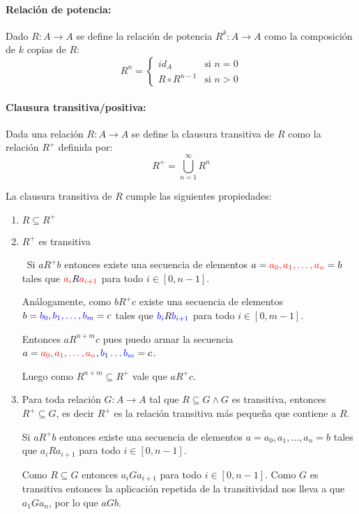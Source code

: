 \paragraph{Relación de potencia:} Dado \(R: A\to A\) se define la relación de potencia \(R^k: A\to A\) como la composición de \(k\) copias de \(R\):
\[R^n = \left\{
  \begin{array}{ll}
    id_A           & \text{si } n = 0 \\
    R\circ R^{n-1} & \text{si } n > 0
  \end{array}
  \right.
\]

\paragraph{Clausura transitiva/positiva:} Dada una relación \(R:A\to A\) se define la clausura transitiva de \(R\) como la relación \(R^+\) definida por: \[R^+ = \bigcup_{n=1}^\infty R^n\]

La clausura transitiva de \(R\) cumple las siguientes propiedades:
\begin{enumerate}
  \item \(R\subseteq R^+\)
        \newpage
  \item \(R^+\) es transitiva
        \begin{demo}[0.86\textwidth]
          ~Si \(a R^+ b\) entonces existe una secuencia de elementos \(a = {\color{red}a_0, a_1, \dots, a_n} = b\) tales que \({\color{red}a_i} R {\color{red}a_{i+1}}\) para todo \(i\in [0,n-1]\).

          \vspace*{0.25cm}
          Análogamente, como \(b R^+ c\) existe una secuencia de elementos \(b = {\color{blue}b_0, b_1, \dots, b_m} = c\) tales que \({\color{blue}b_i} R {\color{blue}b_{i+1}}\) para todo \(i\in [0,m-1]\).

          \vspace*{0.25cm}
          Entonces \(a R^{n+m} c\) pues puedo armar la secuencia \(a = {\color{red}a_0, a_1, \dots, a_n},{\color{blue}b_1\dots b_m} = c\).

          \vspace*{0.25cm}
          Luego como \(R^{n+m}\subseteq R^+\) vale que \(a R^+ c\).
        \end{demo}

  \item Para toda relación \(G:A\to A\) tal que \(R\subseteq G \land G\) es transitiva, entonces \(R^+\subseteq G\), es decir \(R^+\) es la relación transitiva más pequeña que contiene a \(R\).
        \begin{demo}[0.86\textwidth]
          Si \(a R^+ b\) entonces existe una secuencia de elementos \(a = a_0, a_1, \dots, a_n = b\) tales que \(a_i R a_{i+1}\) para todo \(i\in [0,n-1]\).

          \vspace*{0.25cm}
          Como \(R\subseteq G\) entonces \(a_i G a_{i+1}\) para todo \(i\in [0,n-1]\). Como \(G\) es transitiva entonces la aplicación repetida de la transitividad nos lleva a que \(a_1 G a_n\), por lo que \(a G b\).
        \end{demo}
\end{enumerate}

